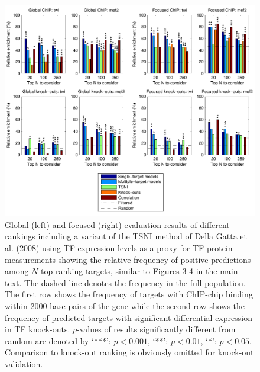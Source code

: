 \documentclass{article}
\begin{document}
\begin{figure}[tb]
  \centering
  \includegraphics{Fig_S2}
  \caption{Global (left) and focused (right) evaluation results of different rankings 
    including a variant of the TSNI method of Della Gatta et al. (2008)
    using TF expression levels as a proxy
    for TF protein measurements showing the relative frequency of positive
    predictions among $N$ top-ranking targets, similar to Figures 3-4 in the
    main text.
    The dashed line
    denotes the frequency in the full population.
    The first row shows the frequency of targets with ChIP-chip
    binding within 2000 base pairs of the gene
    while the second row shows the frequency of
    predicted targets with significant differential
    expression in TF knock-outs.
    $p$-values of results significantly different from random are
    denoted by `***': $p <
    0.001$, `**': $p < 0.01$, `*': $p < 0.05$.
    Comparison to knock-out ranking is obviously omitted for knock-out
    validation. \label{fig:dros_global_evaluation}
  }
\end{figure}
\end{document}
